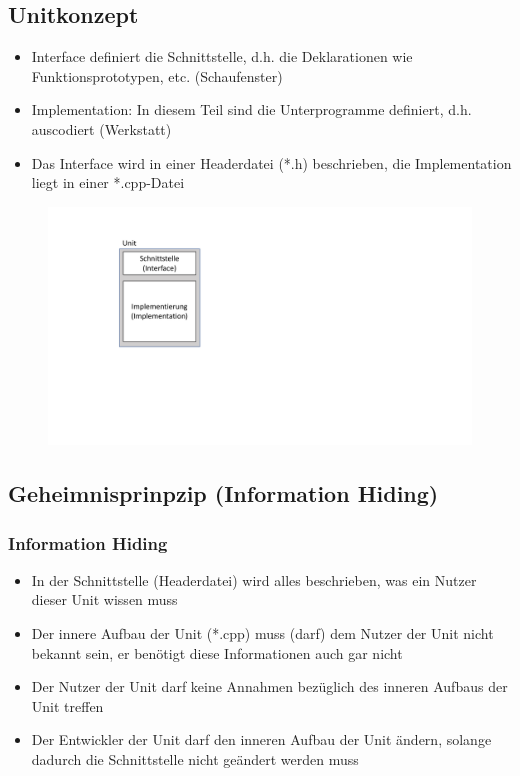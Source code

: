 \subsection{Unitkonzept}
\label{sec:Unitkonzept}
\begin{itemize}
	\item Interface definiert die Schnittstelle, d.h. die Deklarationen wie Funktionsprototypen, etc. (Schaufenster)
	\item Implementation: In diesem Teil sind die Unterprogramme definiert, d.h. auscodiert (Werkstatt)
	\item Das Interface wird in einer Headerdatei (*.h) beschrieben, die Implementation liegt in einer *.cpp-Datei
\end{itemize}
\noindent
\begin{figure}[hh]
	\centering
	\includegraphics[width=0.3\linewidth]{images/unit1.pdf}
\end{figure}

\subsection{Geheimnisprinpzip (Information Hiding)}
\label{sec:Geheimnisprinzip (Information Hiding)}

\subsubsection{Information Hiding}
\label{sec:Information Hiding}
\begin{itemize}
	\item In der Schnittstelle (Headerdatei) wird alles beschrieben, was ein Nutzer dieser Unit wissen muss
	\item Der innere Aufbau der Unit (*.cpp) muss (darf) dem Nutzer der Unit nicht bekannt sein, er benötigt diese Informationen auch gar nicht
	\item Der Nutzer der Unit darf keine Annahmen bezüglich des inneren Aufbaus der Unit treffen
	\item Der Entwickler der Unit darf den inneren Aufbau der Unit ändern, solange dadurch die Schnittstelle nicht geändert werden muss
\end{itemize}

